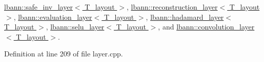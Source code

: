 \hyperlink{classlbann_1_1safe__inv__layer_a1823f1ac48228eec1fa0c1578b2b1ab3}{lbann\+::safe\+\_\+inv\+\_\+layer$<$ T\+\_\+layout $>$}, \hyperlink{classlbann_1_1reconstruction__layer_a738c3f06ea3cee1e8b11672fde6b594e}{lbann\+::reconstruction\+\_\+layer$<$ T\+\_\+layout $>$}, \hyperlink{classlbann_1_1evaluation__layer_ac98eda59f9c45455f0f35f85cbd08a9b}{lbann\+::evaluation\+\_\+layer$<$ T\+\_\+layout $>$}, \hyperlink{classlbann_1_1hadamard__layer_ad575b8b5efddaf3ee64c358b28198de9}{lbann\+::hadamard\+\_\+layer$<$ T\+\_\+layout $>$}, \hyperlink{classlbann_1_1selu__layer_a58e12f4297b2563718417d4acadea010}{lbann\+::selu\+\_\+layer$<$ T\+\_\+layout $>$}, and \hyperlink{classlbann_1_1convolution__layer_abce67d7e977d148093798936aff8ee5e}{lbann\+::convolution\+\_\+layer$<$ T\+\_\+layout $>$}.



Definition at line 209 of file layer.\+cpp.


